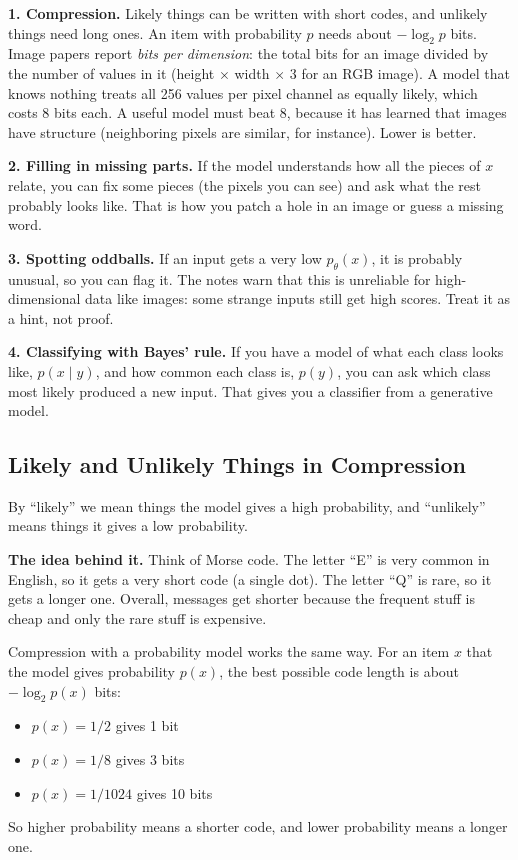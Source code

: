 \textbf{1. Compression.} Likely things can be written with short codes, and unlikely things need long ones. An item with probability $p$ needs about $-\log_2 p$ bits. Image papers report \emph{bits per dimension}: the total bits for an image divided by the number of values in it (height $\times$ width $\times$ 3 for an RGB image). A model that knows nothing treats all 256 values per pixel channel as equally likely, which costs 8 bits each. A useful model must beat 8, because it has learned that images have structure (neighboring pixels are similar, for instance). Lower is better.

\textbf{2. Filling in missing parts.} If the model understands how all the pieces of $x$ relate, you can fix some pieces (the pixels you can see) and ask what the rest probably looks like. That is how you patch a hole in an image or guess a missing word.

\textbf{3. Spotting oddballs.} If an input gets a very low $p_\theta(x)$, it is probably unusual, so you can flag it. The notes warn that this is unreliable for high-dimensional data like images: some strange inputs still get high scores. Treat it as a hint, not proof.

\textbf{4. Classifying with Bayes' rule.} If you have a model of what each class looks like, $p(x \mid y)$, and how common each class is, $p(y)$, you can ask which class most likely produced a new input. That gives you a classifier from a generative model.

\subsection*{Likely and Unlikely Things in Compression}

By ``likely'' we mean things the model gives a high probability, and ``unlikely'' means things it gives a low probability.

\textbf{The idea behind it.} Think of Morse code. The letter ``E'' is very common in English, so it gets a very short code (a single dot). The letter ``Q'' is rare, so it gets a longer one. Overall, messages get shorter because the frequent stuff is cheap and only the rare stuff is expensive.

Compression with a probability model works the same way. For an item $x$ that the model gives probability $p(x)$, the best possible code length is about $-\log_2 p(x)$ bits:
\begin{itemize}
  \item $p(x) = 1/2$ gives 1 bit
  \item $p(x) = 1/8$ gives 3 bits
  \item $p(x) = 1/1024$ gives 10 bits
\end{itemize}
So higher probability means a shorter code, and lower probability means a longer one.


